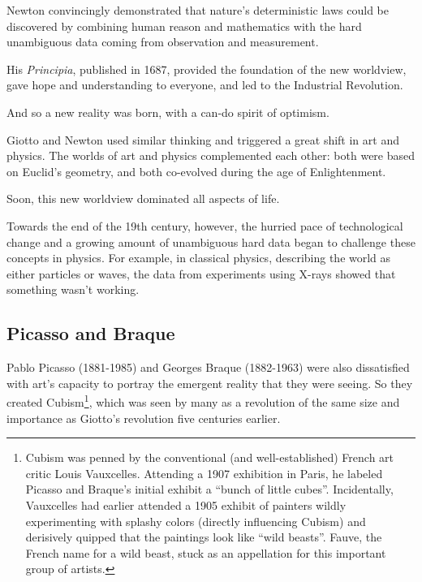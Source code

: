 Newton convincingly demonstrated that nature’s deterministic laws could be discovered by combining human reason and mathematics with the hard unambiguous data coming from observation and measurement.


His \emph{Principia}, published in 1687, provided the foundation of the new worldview, gave hope and understanding to everyone, and led to the Industrial Revolution.


And so a new reality was born, with a can-do spirit of optimism.


Giotto   and Newton  used similar thinking and triggered a great shift in art and physics. The worlds of art and physics complemented each other: both were based on Euclid's geometry, and both co-evolved during the age of Enlightenment. 


Soon, this new worldview dominated all aspects of life.


Towards the end of the 19th century, however, the hurried pace of technological change and a growing amount of unambiguous hard data began to challenge these concepts in physics. For example, in classical physics, describing the world as either particles or waves, the data from experiments using X-rays showed that something wasn’t working\cite{antliff-leighten-cubism-culture}.


\subsection{Picasso and Braque}
Pablo Picasso (1881-1985) and Georges Braque (1882-1963) were also dissatisfied with art’s capacity to portray the emergent reality that they were seeing. So they created Cubism\footnote{Cubism was penned by the conventional (and well-established) French art critic Louis Vauxcelles. Attending a 1907 exhibition in Paris, he labeled Picasso and Braque’s initial exhibit a “bunch of little cubes”. Incidentally, Vauxcelles had earlier attended a 1905 exhibit of painters wildly experimenting with splashy colors (directly influencing Cubism) and derisively quipped that the paintings look like “wild beasts”. Fauve, the French name for a wild beast, stuck as an appellation for this important group of artists.}, which was seen by many as a revolution of the same size and importance as Giotto's revolution five centuries earlier\cite{shlain-art-and-physics}. 


